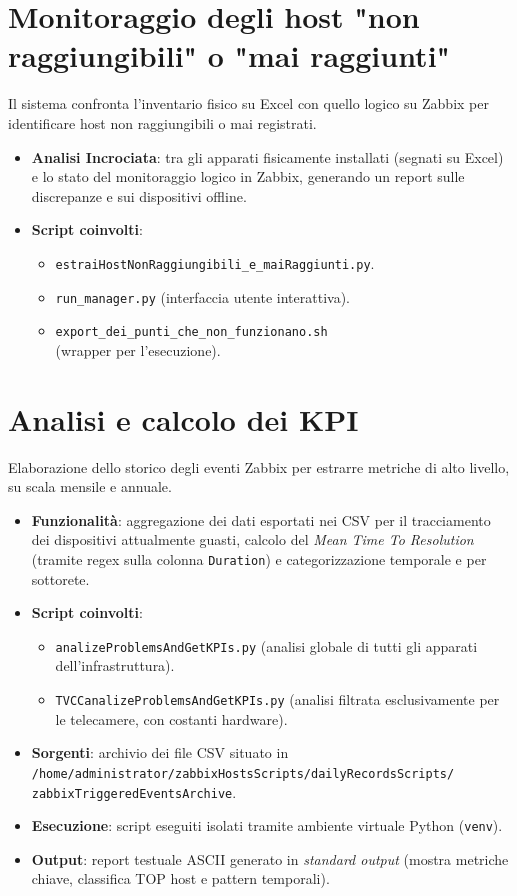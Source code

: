 \documentclass[12pt, a4paper]{report}
\begin{document}
\section{Monitoraggio degli host "non raggiungibili" o "mai raggiunti"}
Il sistema confronta l'inventario fisico su Excel con quello logico su Zabbix per identificare host non raggiungibili o mai registrati.
\begin{itemize}
    \item \textbf{Analisi Incrociata}: tra gli apparati fisicamente installati (segnati su Excel) e lo stato del monitoraggio logico in Zabbix,
     generando un report sulle discrepanze e sui dispositivi offline.
    \item \textbf{Script coinvolti}:
    \begin{itemize}
        \item \texttt{estraiHostNonRaggiungibili\_e\_maiRaggiunti.py}.
        \item \texttt{run\_manager.py} (interfaccia utente interattiva).
        \item \texttt{export\_dei\_punti\_che\_non\_funzionano.sh} \\(wrapper per l'esecuzione).
    \end{itemize}
\end{itemize}

\section{Analisi e calcolo dei KPI}
Elaborazione dello storico degli eventi Zabbix per estrarre metriche di alto livello, su scala mensile e annuale.
\begin{itemize}
    \item \textbf{Funzionalità}: aggregazione dei dati esportati nei CSV per il tracciamento dei dispositivi attualmente guasti, 
    calcolo del \textit{Mean Time To Resolution} 
    (tramite regex sulla colonna \texttt{Duration}) e categorizzazione temporale e per sottorete.
    \item \textbf{Script coinvolti}:
    \begin{itemize}
        \item \texttt{analizeProblemsAndGetKPIs.py} (analisi globale di tutti gli apparati dell'infrastruttura).
        \item \texttt{TVCCanalizeProblemsAndGetKPIs.py} (analisi filtrata esclusivamente per le telecamere,
         con costanti hardware).
    \end{itemize}
    \item \textbf{Sorgenti}: archivio dei file CSV situato in 
    \\\texttt{/home/administrator/zabbixHostsScripts/dailyRecordsScripts/}\\\texttt{zabbixTriggeredEventsArchive}.
    \item \textbf{Esecuzione}: script eseguiti isolati tramite ambiente virtuale Python (\texttt{venv}).
    \item \textbf{Output}: report testuale ASCII generato in \textit{standard output} 
    (mostra metriche chiave, classifica TOP host e pattern temporali).
\end{itemize}
\end{document}
